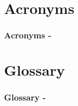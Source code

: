 %
%
%

\section*{Acronyms}

\begin{frame}[t,allowframebreaks]
  \frametitle{Acronyms -}
  \printglossary[type=\acronymtype]
\end{frame}

%
%
%

\section*{Glossary}

\begin{frame}[t,allowframebreaks]
  \frametitle{Glossary -}
  \printglossary[type=main]
\end{frame}

